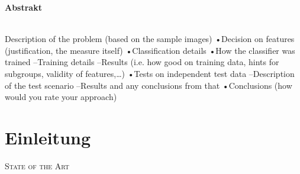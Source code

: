 \documentclass[liststotoc,11pt,a4paper]{article}
\begin{document}
\thispagestyle{empty}
\newpage
\setcounter{page}{1}
\tableofcontents                %
\newpage


\Large \bfseries Abstrakt\\
\normalsize \mdseries
{}
\\
Description of the problem (based on the sample images)
•Decision on features (justification, the measure itself)
•Classification details
•How the classifier was trained
–Training details
–Results (i.e. how good on training data, hints for subgroups, validity of features,…)
•Tests on independent test data
–Description of the test scenario
–Results and any conclusions from that
•Conclusions (how would you rate your approach)
\section{Einleitung}
\label{firstSec}

\scshape State of the Art\\ 
\newline 
\normalfont

\newpage
{}	%
\setcounter{page}{6}
\renewcommand{\refname}{Referenzen}


\end{document}
